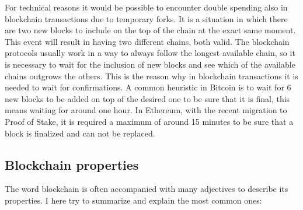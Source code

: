 For technical reasons it would be possible to encounter double spending also in blockchain transactions due to temporary forks. It is a situation in which there are two new blocks to include on the top of the chain at the exact same moment. This event will result in having two different chains, both valid. The blockchain protocols usually work in a way to always follow the longest available chain, so it is necessary to wait for the inclusion of new blocks and see which of the available chains outgrows the others. This is the reason why in blockchain transactions it is needed to wait for confirmations. A common heuristic in Bitcoin is to wait for 6 new blocks to be added on top of the desired one to be sure that it is final, this means waiting for around one hour. In Ethereum, with the recent migration to Proof of Stake, it is required a maximum of around 15 minutes to be sure that a block is finalized and can not be replaced.

\subsection{Blockchain properties}

The word blockchain is often accompanied with many adjectives to describe its properties. I here try to summarize and explain the most common ones:


